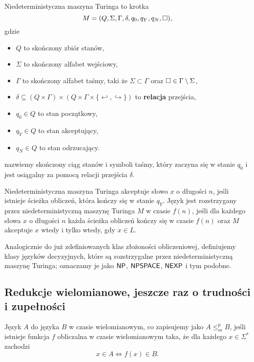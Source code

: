 \begin{definition}
    Niedeterministyczna maszyna Turinga to krotka
    \[ M = (Q, \Sigma, \Gamma, \delta, q_0, q_Y, q_N, \square),\]
    gdzie
    \begin{itemize}[noitemsep]
        \item $Q$ to skończony zbiór stanów,
        \item $\Sigma$ to skończony alfabet wejściowy,
        \item $\Gamma$ to skończony alfabet taśmy, taki że $\Sigma \subset \Gamma$ oraz $\square \in \Gamma \setminus \Sigma$,
        \item $\delta \subseteq \left(Q \times \Gamma\right) \times \left(Q \times \Gamma \times \{\hookleftarrow , \hookrightarrow\}\right)$ to \textbf{relacja}  przejścia,
        \item $q_0 \in Q$ to stan początkowy,
        \item $q_Y \in Q$ to stan akceptujący,
        \item $q_N \in Q$ to stan odrzucający.
    \end{itemize}

     nazwiemy skończony ciąg stanów i symboli taśmy, który zaczyna się w stanie $q_0$ i jest osiągalny za pomocą relacji przejścia $\delta$.

    Niedeterministyczna maszyna Turinga akceptuje słowo $x$ o długości $n$, jeśli istnieje ścieżka obliczeń, która kończy się w stanie $q_Y$. Język jest rozstrzygany przez niedeterministyczną maszynę Turinga $M$ w czasie $f(n)$, jeśli dla każdego słowa $x$ o długości $n$ każda ścieżka obliczeń kończy się w czasie $f(n)$ oraz $M$ akceptuje $x$ wtedy i tylko wtedy, gdy $x \in L$.
\end{definition}

Analogicznie do już zdefiniowanych klas złożoności obliczeniowej, definiujemy klasy języków decyzyjnych, które są rozstrzygalne przez niedeterministyczną maszynę Turinga; oznaczamy je jako $\textsf{NP}$, $\textsf{NPSPACE}$, $\textsf{NEXP}$ i tym podobne.

\subsection{Redukcje wielomianowe, jeszcze raz o trudności i zupełności}

\begin{definition}\label{d:poly reduction}
    Język $A$  do języka $B$ w czasie wielomianowym, co zapisujemy jako $A \leq_m^p B$, jeśli istnieje funkcja $f$ obliczalna w czasie wielomianowym taka, że dla każdego $x \in \Sigma^*$ zachodzi
    \[ x \in A \iff f(x) \in B. \]
\end{definition}

